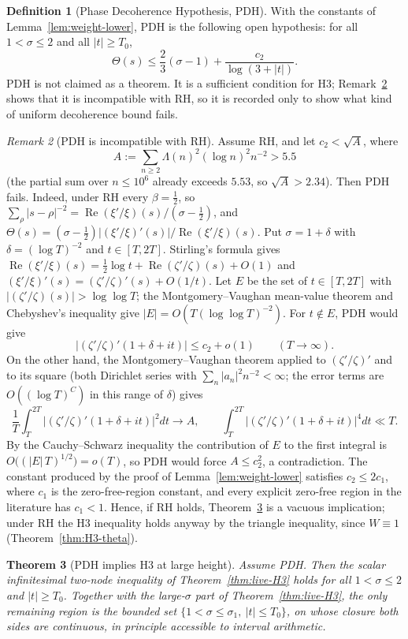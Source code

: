 \documentclass[11pt]{amsart}
\newtheorem{theorem}{Theorem}[section]
\theoremstyle{definition}
\newtheorem{definition}[theorem]{Definition}
\theoremstyle{remark}
\newtheorem{remark}[theorem]{Remark}
\theoremstyle{definition}
\renewcommand{\Re}{\operatorname{Re}}
\newcommand{\half}{\tfrac{1}{2}}
\begin{document}
\begin{definition}[Phase Decoherence Hypothesis, PDH]\label{def:PDH}
With the constants of Lemma~\ref{lem:weight-lower}, PDH is the following open hypothesis: for all
$1<\sigma\le2$ and all $|t|\ge T_0$,
\[
   \Theta(s)\le \frac23(\sigma-1)+\frac{c_2}{\log(3+|t|)}.
\]
PDH is not claimed as a theorem.  It is a sufficient condition for H3; Remark~\ref{rmk:PDH-false}
shows that it is incompatible with RH, so it is recorded only to show what kind of uniform decoherence
bound fails.
\end{definition}

\begin{remark}[PDH is incompatible with RH]\label{rmk:PDH-false}
Assume RH, and let $c_2<\sqrt{A}$, where
\[
   A:=\sum_{n\ge2}\Lambda(n)^2(\log n)^2n^{-2}>5.5
\]
(the partial sum over $n\le10^6$ already exceeds $5.53$, so $\sqrt A>2.34$).  Then PDH fails.  Indeed, under RH every $\beta=\half$, so
$\sum_\rho|s-\rho|^{-2}=\Re(\xi'/\xi)(s)/(\sigma-\half)$, and
$\Theta(s)=(\sigma-\half)|(\xi'/\xi)'(s)|/\Re(\xi'/\xi)(s)$.  Put $\sigma=1+\delta$ with
$\delta=(\log T)^{-2}$ and $t\in[T,2T]$.  Stirling's formula gives
$\Re(\xi'/\xi)(s)=\half\log t+\Re(\zeta'/\zeta)(s)+O(1)$ and
$(\xi'/\xi)'(s)=(\zeta'/\zeta)'(s)+O(1/t)$.  Let $E$ be the set of $t\in[T,2T]$ with
$|(\zeta'/\zeta)(s)|>\log\log T$; the Montgomery--Vaughan mean-value theorem and Chebyshev's
inequality give $|E|=O(T(\log\log T)^{-2})$.  For $t\notin E$, PDH would give
\[
   |(\zeta'/\zeta)'(1+\delta+it)|\le c_2+o(1)\qquad(T\to\infty).
\]
On the other hand, the Montgomery--Vaughan theorem applied to $(\zeta'/\zeta)'$ and to its square
(both Dirichlet series with $\sum_n|a_n|^2n^{-2}<\infty$; the error terms are $O((\log T)^{C})$ in
this range of $\delta$) gives
\[
   \frac1T\int_T^{2T}|(\zeta'/\zeta)'(1+\delta+it)|^2dt\to A,
   \qquad
   \int_T^{2T}|(\zeta'/\zeta)'(1+\delta+it)|^4dt\ll T .
\]
By the Cauchy--Schwarz inequality the contribution of $E$ to the first integral is
$O\bigl((|E|\,T)^{1/2}\bigr)=o(T)$, so PDH would force $A\le c_2^2$, a contradiction.  The constant
produced by the proof of Lemma~\ref{lem:weight-lower} satisfies $c_2\le2c_1$, where $c_1$ is the
zero-free-region constant, and every explicit zero-free region in the literature has $c_1<1$.  Hence,
if RH holds, Theorem~\ref{thm:PDH-H3} is a vacuous implication; under RH the H3 inequality holds anyway
by the triangle inequality, since $W\equiv1$ (Theorem~\ref{thm:H3-theta}).
\end{remark}

\begin{theorem}[PDH implies H3 at large height]\label{thm:PDH-H3}
Assume PDH.  Then the scalar infinitesimal two-node inequality of
Theorem~\ref{thm:live-H3} holds for all $1<\sigma\le2$ and $|t|\ge T_0$.  Together with the
large-$\sigma$ part of Theorem~\ref{thm:live-H3}, the only remaining region is the bounded set
$\{1<\sigma\le\sigma_1,\ |t|\le T_0\}$, on whose closure both sides are continuous,
in principle accessible to interval arithmetic.
\end{theorem}
\end{document}
